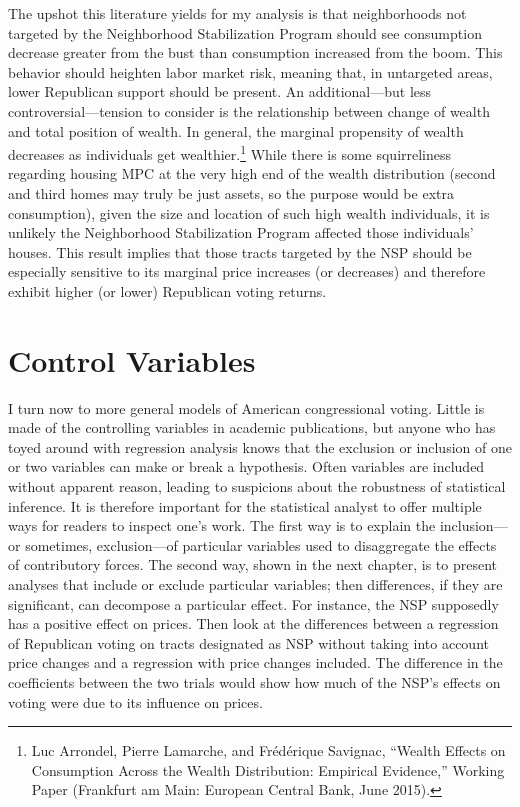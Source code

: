 \documentclass[12pt,oneside]{psthesis}
\begin{document}
The upshot this literature yields for my analysis is that neighborhoods not targeted by the Neighborhood Stabilization Program should see consumption decrease greater from the bust than consumption increased from the boom.
This behavior should heighten labor market risk, meaning that, in untargeted areas, lower Republican support should be present.
An additional---but less controversial---tension to consider is the relationship between change of wealth and total position of wealth.
In general, the marginal propensity of wealth decreases as individuals get wealthier.\footnote{Luc Arrondel, Pierre Lamarche, and Frédérique Savignac, ``Wealth Effects on Consumption Across the Wealth Distribution: Empirical Evidence,'' Working Paper (Frankfurt am Main: European Central Bank, June 2015).}
While there is some squirreliness regarding housing MPC at the very high end of the wealth distribution (second and third homes may truly be just assets, so the purpose would be extra consumption), given the size and location of such high wealth individuals, it is unlikely the Neighborhood Stabilization Program affected those individuals' houses.
This result implies that those tracts targeted by the NSP should be especially sensitive to its marginal price increases (or decreases) and therefore exhibit higher (or lower) Republican voting returns.

\hypertarget{controls}{%
\section{Control Variables}\label{controls}}

I turn now to more general models of American congressional voting.
Little is made of the controlling variables in academic publications, but anyone who has toyed around with regression analysis knows that the exclusion or inclusion of one or two variables can make or break a hypothesis.
Often variables are included without apparent reason, leading to suspicions about the robustness of statistical inference.
It is therefore important for the statistical analyst to offer multiple ways for readers to inspect one's work.
The first way is to explain the inclusion---or sometimes, exclusion---of particular variables used to disaggregate the effects of contributory forces.
The second way, shown in the next chapter, is to present analyses that include or exclude particular variables; then differences, if they are significant, can decompose a particular effect.
For instance, the NSP supposedly has a positive effect on prices.
Then look at the differences between a regression of Republican voting on tracts designated as NSP without taking into account price changes and a regression with price changes included.
The difference in the coefficients between the two trials would show how much of the NSP's effects on voting were due to its influence on prices.
\end{document}
